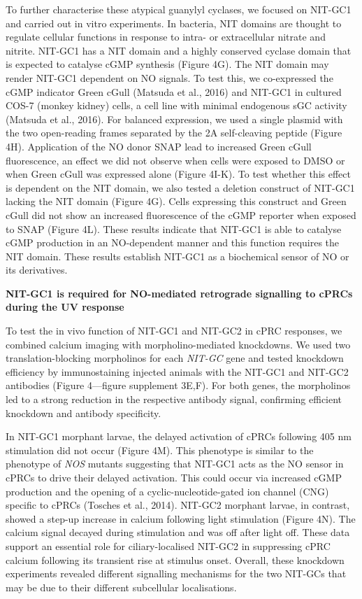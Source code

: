 \documentclass[
  10pt,
  onecolumn]{article}
\begin{document}
To further characterise these atypical guanylyl cyclases, we focused on
NIT-GC1 and carried out in vitro experiments. In bacteria, NIT domains
are thought to regulate cellular functions in response to intra- or
extracellular nitrate and nitrite. NIT-GC1 has a NIT domain and a highly
conserved cyclase domain that is expected to catalyse cGMP synthesis
(Figure 4G). The NIT domain may render NIT-GC1 dependent on NO signals.
To test this, we co-expressed the cGMP indicator Green cGull (Matsuda et
al., 2016) and NIT-GC1 in cultured COS-7 (monkey kidney) cells, a cell
line with minimal endogenous sGC activity (Matsuda et al., 2016). For
balanced expression, we used a single plasmid with the two open-reading
frames separated by the 2A self-cleaving peptide (Figure 4H).
Application of the NO donor SNAP lead to increased Green cGull
fluorescence, an effect we did not observe when cells were exposed to
DMSO or when Green cGull was expressed alone (Figure 4I-K). To test
whether this effect is dependent on the NIT domain, we also tested a
deletion construct of NIT-GC1 lacking the NIT domain (Figure 4G). Cells
expressing this construct and Green cGull did not show an increased
fluorescence of the cGMP reporter when exposed to SNAP (Figure 4L).
These results indicate that NIT-GC1 is able to catalyse cGMP production
in an NO-dependent manner and this function requires the NIT domain.
These results establish NIT-GC1 as a biochemical sensor of NO or its
derivatives.

\textbf{NIT-GC1 is required for NO-mediated retrograde signalling to
cPRCs during the UV response}

To test the in vivo function of NIT-GC1 and NIT-GC2 in cPRC responses,
we combined calcium imaging with morpholino-mediated knockdowns. We used
two translation-blocking morpholinos for each \emph{NIT-GC} gene and
tested knockdown efficiency by immunostaining injected animals with the
NIT-GC1 and NIT-GC2 antibodies (Figure 4---figure supplement 3E,F). For
both genes, the morpholinos led to a strong reduction in the respective
antibody signal, confirming efficient knockdown and antibody
specificity.

In NIT-GC1 morphant larvae, the delayed activation of cPRCs following
405 nm stimulation did not occur (Figure 4M). This phenotype is similar
to the phenotype of \emph{NOS} mutants suggesting that NIT-GC1 acts as
the NO sensor in cPRCs to drive their delayed activation. This could
occur via increased cGMP production and the opening of a
cyclic-nucleotide-gated ion channel (CNG) specific to cPRCs (Tosches et
al., 2014). NIT-GC2 morphant larvae, in contrast, showed a step-up
increase in calcium following light stimulation (Figure 4N). The calcium
signal decayed during stimulation and was off after light off. These
data support an essential role for ciliary-localised NIT-GC2 in
suppressing cPRC calcium following its transient rise at stimulus onset.
Overall, these knockdown experiments revealed different signalling
mechanisms for the two NIT-GCs that may be due to their different
subcellular localisations.
\end{document}
